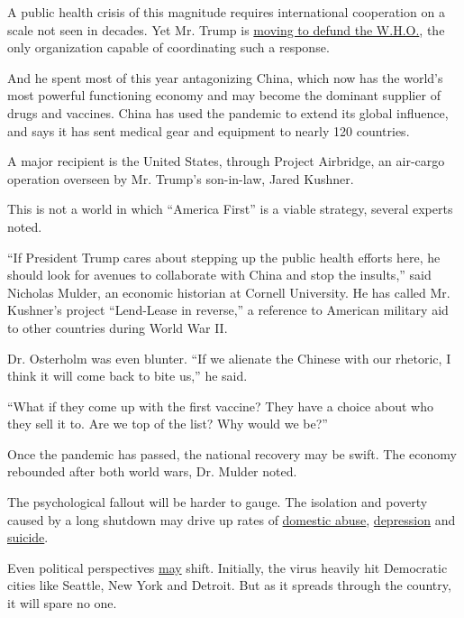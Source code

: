 A public health crisis of this magnitude requires international
cooperation on a scale not seen in decades. Yet Mr. Trump is
\href{https://www.nytimes.com/2020/04/14/us/coronavirus-updates.html}{moving
to defund the W.H.O.}, the only organization capable of coordinating
such a response.

And he spent most of this year antagonizing China, which now has the
world's most powerful functioning economy and may become the dominant
supplier of drugs and vaccines. China has used the pandemic to extend
its global influence, and says it has sent medical gear and equipment to
nearly 120 countries.

A major recipient is the United States, through Project Airbridge, an
air-cargo operation overseen by Mr. Trump's son-in-law, Jared Kushner.

This is not a world in which ``America First'' is a viable strategy,
several experts noted.

``If President Trump cares about stepping up the public health efforts
here, he should look for avenues to collaborate with China and stop the
insults,'' said Nicholas Mulder, an economic historian at Cornell
University. He has called Mr. Kushner's project ``Lend-Lease in
reverse,'' a reference to American military aid to other countries
during World War II.

Dr. Osterholm was even blunter. ``If we alienate the Chinese with our
rhetoric, I think it will come back to bite us,'' he said.

``What if they come up with the first vaccine? They have a choice about
who they sell it to. Are we top of the list? Why would we be?''

Once the pandemic has passed, the national recovery may be swift. The
economy rebounded after both world wars, Dr. Mulder noted.

The psychological fallout will be harder to gauge. The isolation and
poverty caused by a long shutdown may drive up rates of
\href{https://www.nytimes.com/2020/04/17/nyregion/new-york-city-domestic-violence-coronavirus.html}{domestic
abuse},
\href{https://www.nytimes.com/2020/04/09/opinion/sunday/coronavirus-depression-anxiety.html}{depression}
and
\href{https://jamanetwork.com/journals/jamapsychiatry/fullarticle/2764584}{suicide}.

Even political perspectives
\href{https://time.com/5674850/2020-election-demographics/}{may} shift.
Initially, the virus heavily hit Democratic cities like Seattle, New
York and Detroit. But as it spreads through the country, it will spare
no one.

